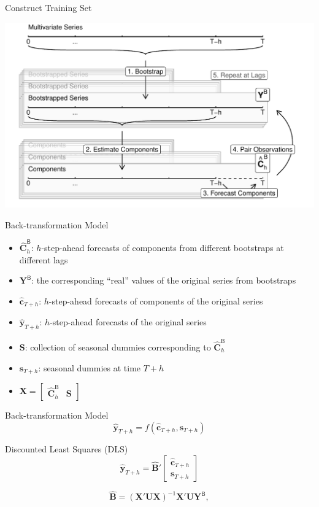 \documentclass[14pt,ignorenonframetext,]{beamer}
\providecommand{\tightlist}{%
  \setlength{\itemsep}{0pt}\setlength{\parskip}{0pt}}
\begin{document}
\begin{frame}{Construct Training Set}
\protect\hypertarget{construct-training-set-1}{}
\begin{center}
\includegraphics[width=\linewidth]{plot/p_backtransform_notation}
\end{center}
\end{frame}

\begin{frame}{Back-transformation Model}
\protect\hypertarget{back-transformation-model}{}
\begin{itemize}
\tightlist
\item
  \(\hat{\bm{C}}^\mathsf{B}_h\): \(h\)-step-ahead forecasts of
  components from different bootstraps at different lags
\item
  \(\bm{Y}^\mathsf{B}\): the corresponding ``real'' values of the
  original series from bootstraps
\item
  \(\hat{\bm{c}}_{T+h}\): \(h\)-step-ahead forecasts of components of
  the original series
\item
  \(\hat{\bm{y}}_{T+h}\): \(h\)-step-ahead forecasts of the original
  series
\item
  \(\bm{S}\): collection of seasonal dummies corresponding to
  \(\hat{\bm{C}}^\mathsf{B}_h\)
\item
  \(\bm{s}_{T+h}\): seasonal dummies at time \(T+h\)
\item
  \(\bm{X} = \begin{bmatrix}\hat{\bm{C}}^\mathsf{B}_h & \bm{S}\end{bmatrix}\)
\end{itemize}
\end{frame}

\begin{frame}{Back-transformation Model}
\protect\hypertarget{back-transformation-model-1}{}
\[
\hat{\bm{y}}_{T+h} = 
f(\hat{\bm{c}}_{T + h}, \bm{s}_{T+h})
\]

\begin{block}{Discounted Least Squares (DLS)}
\protect\hypertarget{discounted-least-squares-dls}{}
\[
\hat{\bm{y}}_{T+h} = 
\hat{\bm{B}}'
\begin{bmatrix}
\hat{\bm{c}}_{T + h} \\ \bm{s}_{T+h}
\end{bmatrix}
\]

\[
\hat{\bm{B}} = (\bm{X}'\bm{U}\bm{X})^{-1}\bm{X}'\bm{U}\bm{Y}^\mathsf{B}, 
\]
\end{block}
\end{frame}
\end{document}
